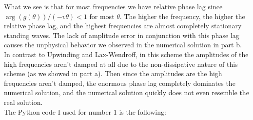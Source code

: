 \documentclass[12pt]{article}
\begin{document}
What we see is that for most frequencies we have relative phase lag since $\arg(g(\theta))/(-v\theta)<1$ for most $\theta$. The higher the frequency, the higher the relative phase lag, and the highest frequencies are almost completely stationary standing waves.  The lack of amplitude error in conjunction with this phase lag causes the unphysical behavior we observed in the numerical solution in part b.  In contrast to Upwinding and Lax-Wendroff, in this scheme the amplitudes of the high frequencies aren't damped at all due to the non-dissipative nature of this scheme (as we showed in part a).  Then since the amplitudes are the high frequencies aren't damped, the enormous phase lag completely dominates the numerical solution, and the numerical solution quickly does not even resemble the real solution.\\

The Python code I used for number 1 is the following:
\end{document}
